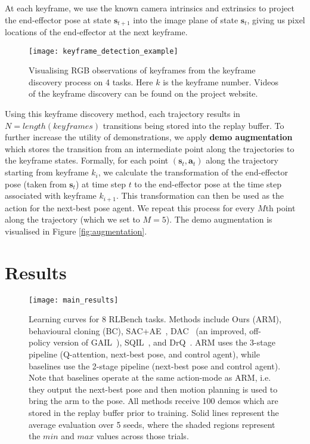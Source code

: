 \documentclass[letterpaper, 10 pt, journal, twoside]{IEEEtran}
\newcommand{\bs}{\mathbf{s}}
\newcommand{\ba}{\mathbf{a}}
\newcommand{\st}{\bs_t}
\newcommand{\at}{\ba_t}
\newcommand{\stp}{\bs_{t+1}}
\begin{document}
At each keyframe, we use the known camera intrinsics and extrinsics to project the end-effector pose at state $\stp$ into the image plane of state $\st$, giving us pixel locations of the end-effector at the next keyframe. 

\begin{figure}
\centering
\texttt{[image: keyframe\_detection\_example]}
\caption{Visualising RGB observations of keyframes from the keyframe discovery process on 4 tasks. Here $k$ is the keyframe number. Videos of the keyframe discovery can be found on the project website.}
\label{fig:keyframes}
\vspace{-15pt}
\end{figure}

Using this keyframe discovery method, each trajectory results in $N=length(keyframes)$ transitions being stored into the replay buffer. To further increase the utility of demonstrations, we apply \textbf{demo augmentation} which stores the transition from an intermediate point along the trajectories to the keyframe states. Formally, for each point $(\st, \at)$ along the trajectory starting from keyframe $k_i$, we calculate the transformation of the end-effector pose (taken from $\st$) at time step $t$ to the end-effector pose at the time step associated with keyframe $k_{i+1}$. This transformation can then be used as the action for the next-best pose agent. We repeat this process for every $M$th point along the trajectory (which we set to $M=5$). The demo augmentation is visualised in Figure \ref{fig:augmentation}.


\section{Results}

\begin{figure*}
\centering
\texttt{[image: main\_results]}
\caption{Learning curves for 8 RLBench tasks. Methods include Ours (ARM), behavioural cloning (BC), SAC+AE~\cite{yarats2019improving}, DAC~\cite{kostrikov2018discriminator} (an improved, off-policy version of GAIL~\cite{ho2016generative}), SQIL~\cite{reddy2019sqil}, and DrQ~\cite{kostrikov2020image}. ARM uses the 3-stage pipeline (Q-attention, next-best pose, and control agent), while baselines use the 2-stage pipeline (next-best pose and control agent). Note that baselines operate at the same action-mode as ARM, i.e. they output the next-best pose and then motion planning is used to bring the arm to the pose. All methods receive 100 demos which are stored in the replay buffer prior to training. Solid lines represent the average evaluation over 5 seeds, where the shaded regions represent the $min$ and $max$ values across those trials.}
\label{fig:results_rlbench}
\end{figure*}
\end{document}
